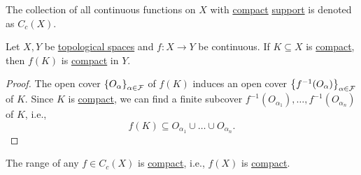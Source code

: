 \begin{notation}
	The collection of all continuous functions on \(X\) with \hyperref[def:compact]{compact} \hyperref[def:support]{support} is denoted as \(C_c(X)\).
\end{notation}

\begin{theorem}\label{thm:lec26}
	Let \(X, Y\) be \hyperref[def:topological-space]{topological spaces} and \(f\colon X \to Y\) be continuous. If \(K \subseteq X\) is \hyperref[def:compact]{compact}, then \(f(K)\) is \hyperref[def:compact]{compact} in \(Y\).
\end{theorem}
\begin{proof}
	The open cover \(\left\{ O_\alpha  \right\}_{\alpha \in \mathcal{\MakeUppercase{f}} } \) of \(f(K)\) induces an open cover \(\left\{ f^{-1} (O_\alpha ) \right\}_{\alpha \in \mathcal{\MakeUppercase{f}} } \) of \(K\). Since \(K\) is \hyperref[def:compact]{compact}, we can find a finite subcover \(f^{-1} (O_{\alpha _1}), \ldots , f^{-1} (O_{\alpha _n}) \) of \(K\), i.e.,
	\[
		f(K) \subseteq O_{\alpha _1} \cup \ldots \cup O_{\alpha _n}.
	\]
\end{proof}

\begin{remark}
	The range of any \(f\in C_c(X)\) is \hyperref[def:compact]{compact}, i.e., \(f(X)\) is \hyperref[def:compact]{compact}.
\end{remark}

